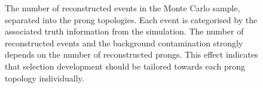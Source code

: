 \begin{figure}
  \centering
  \caption{The number of reconstructed events in the Monte Carlo sample, separated into the prong topologies.  Each event is categorised by the associated truth information from the simulation.  The number of reconstructed events and the background contamination strongly depends on the number of reconstructed prongs.  This effect indicates that selection development should be tailored towards each prong topology individually.}
  \label{fig:ProngStackAll}
\end{figure}
